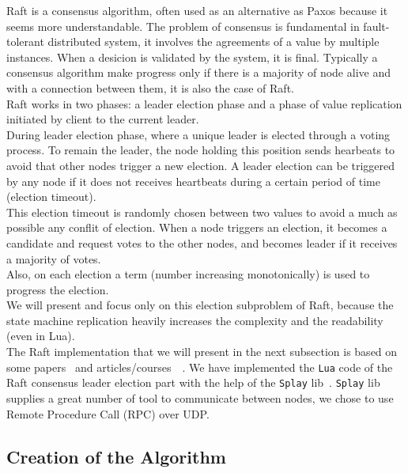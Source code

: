 \documentclass{eplmastersthesis}
\begin{document}
        Raft is a consensus algorithm, often used as an alternative as Paxos because
        it seems more understandable. The problem of consensus is fundamental
        in fault-tolerant distributed system, it involves the agreements of
        a value by multiple instances. When a desicion is validated by the system,
        it is final. Typically a consensus algorithm make progress only if there is
        a majority of node alive and with a connection between them, it is
        also the case of Raft. \\

        Raft works in two phases: a leader election phase and a phase of
        value replication initiated by client to the current leader.\\
        During leader election phase, where a unique leader is elected
        through a voting process. To remain the leader, the node holding
        this position sends hearbeats to avoid that other nodes trigger a
        new election. A leader election can be triggered by any node if it
        does not receives heartbeats during a certain period of time (election
        timeout).\\
        This election timeout is randomly chosen between two values
        to avoid a much as possible any conflit of election. When a node
        triggers an election, it becomes a candidate and request votes to
        the other nodes, and becomes leader if it receives a majority of votes.\\
        Also, on each election a term (number increasing monotonically)
        is used to progress the election.\\
        We will present and focus only on this election subproblem of
        Raft, because the state machine replication heavily increases the complexity and
        the readability (even in Lua).\\

        The Raft implementation that we will present in the next subsection is based on
        some papers~\cite{RaftPaper} and articles/courses~\cite{RaftSlide}~\cite{RaftSite}.
        We have implemented the \texttt{Lua} code of the Raft consensus leader
        election part with the help of the \texttt{Splay} lib~\cite{SplayLib}.
        \texttt{Splay} lib supplies a great number of tool to communicate
        between nodes, we chose to use Remote Procedure Call (RPC) over UDP.\\

      \subsection{Creation of the Algorithm}
\end{document}
